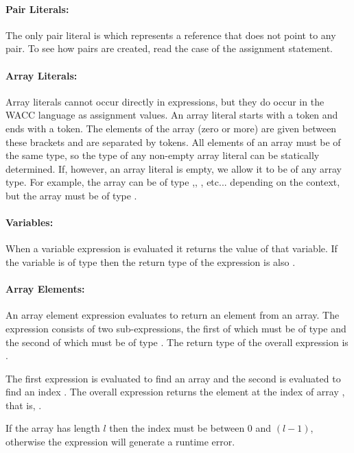 \documentclass[a4paper]{article}
\theoremstyle{definition}
\begin{document}
\paragraph{Pair Literals:}
The only pair literal  is  which represents a reference that does not point to any pair.
To see how pairs are created, read the  case of the assignment statement.

\paragraph{Array Literals:} Array literals cannot occur directly in expressions, but they do occur in the WACC language as assignment values.
An array literal starts with a \lit{[} token and ends with a \lit{]} token.
The elements of the array (zero or more) are given between these brackets and are separated by \lit{,} tokens.
All elements of an array must be of the same type, so the type of any non-empty array literal can be statically determined.
If, however, an array literal is empty, we allow it to be of any array type.
For example, the array \lit{[]} can be of type ,, , etc... depending on the context, but the array \lit{[1]} must be of type .

\paragraph{Variables:}
When a variable expression  is evaluated it returns the value of that variable.
If the variable is of type  then the return type of the expression is also .

\paragraph{Array Elements:}
An array element expression evaluates to return an element from an array.
The expression consists of two sub-expressions, the first of which must be of type  and the second of which must be of type .
The return type of the overall expression is .

The first expression is evaluated to find an array  and the second is evaluated to find an index .
The overall expression returns the element at the index  of array , that is, .

If the array has length $l$ then the index  must be between $0$ and $(l - 1)$,
otherwise the expression will generate a runtime error.
\end{document}
